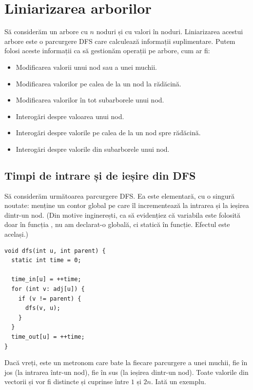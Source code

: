 \documentclass[../main.tex]{subfiles}
\begin{document}
\chapter{Liniarizarea arborilor}

Să considerăm un arbore cu $n$ noduri și cu valori în noduri. Liniarizarea acestui arbore este o parcurgere DFS care calculează informații suplimentare. Putem folosi aceste informații ca să gestionăm operații pe arbore, cum ar fi:

\begin{itemize}
  \item Modificarea valorii unui nod sau a unei muchii.
  \item Modificarea valorilor pe calea de la un nod la rădăcină.
  \item Modificarea valorilor în tot subarborele unui nod.
  \item Interogări despre valoarea unui nod.
  \item Interogări despre valorile pe calea de la un nod spre rădăcină.
  \item Interogări despre valorile din subarborele unui nod.
\end{itemize}

\section{Timpi de intrare și de ieșire din DFS}

Să considerăm următoarea parcurgere DFS. Ea este elementară, cu o singură noutate: menține un contor global pe care îl incrementează la intrarea și la ieșirea dintr-un nod. (Din motive inginerești, ca să evidențiez că variabila  este folosită doar în funcția , nu am declarat-o globală, ci statică în funcție. Efectul este același.)

\begin{verbatim}
void dfs(int u, int parent) {
  static int time = 0;

  time_in[u] = ++time;
  for (int v: adj[u]) {
    if (v != parent) {
      dfs(v, u);
    }
  }
  time_out[u] = ++time;
}
\end{verbatim}

Dacă vreți,  este un metronom care bate la fiecare parcurgere a unei muchii, fie în jos (la intrarea într-un nod), fie în sus (la ieșirea dintr-un nod). Toate valorile din vectorii  și  vor fi distincte și cuprinse între $1$ și $2n$. Iată un exemplu.
\end{document}
